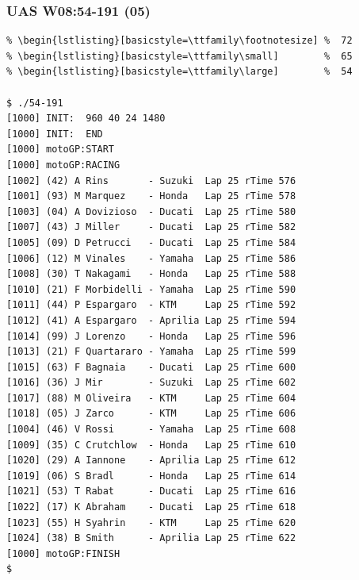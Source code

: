 \documentclass[aspectratio=169, xcolor=table, notheorems, hyperref={pdfpagelabels=false}]{beamer}
\begin{document}
\begin{frame}[fragile]
\frametitle{UAS W08:54-191 (05)}
\begin{lstlisting}[basicstyle=\ttfamily\tiny]         % 108
% \begin{lstlisting}[basicstyle=\ttfamily\tiny]         % 108
% \begin{lstlisting}[basicstyle=\ttfamily\footnotesize] %  72
% \begin{lstlisting}[basicstyle=\ttfamily\small]        %  65
% \begin{lstlisting}[basicstyle=\ttfamily\large]        %  54

$ ./54-191 
[1000] INIT:  960 40 24 1480
[1000] INIT:  END
[1000] motoGP:START
[1000] motoGP:RACING
[1002] (42) A Rins       - Suzuki  Lap 25 rTime 576
[1001] (93) M Marquez    - Honda   Lap 25 rTime 578
[1003] (04) A Dovizioso  - Ducati  Lap 25 rTime 580
[1007] (43) J Miller     - Ducati  Lap 25 rTime 582
[1005] (09) D Petrucci   - Ducati  Lap 25 rTime 584
[1006] (12) M Vinales    - Yamaha  Lap 25 rTime 586
[1008] (30) T Nakagami   - Honda   Lap 25 rTime 588
[1010] (21) F Morbidelli - Yamaha  Lap 25 rTime 590
[1011] (44) P Espargaro  - KTM     Lap 25 rTime 592
[1012] (41) A Espargaro  - Aprilia Lap 25 rTime 594
[1014] (99) J Lorenzo    - Honda   Lap 25 rTime 596
[1013] (21) F Quartararo - Yamaha  Lap 25 rTime 599
[1015] (63) F Bagnaia    - Ducati  Lap 25 rTime 600
[1016] (36) J Mir        - Suzuki  Lap 25 rTime 602
[1017] (88) M Oliveira   - KTM     Lap 25 rTime 604
[1018] (05) J Zarco      - KTM     Lap 25 rTime 606
[1004] (46) V Rossi      - Yamaha  Lap 25 rTime 608
[1009] (35) C Crutchlow  - Honda   Lap 25 rTime 610
[1020] (29) A Iannone    - Aprilia Lap 25 rTime 612
[1019] (06) S Bradl      - Honda   Lap 25 rTime 614
[1021] (53) T Rabat      - Ducati  Lap 25 rTime 616
[1022] (17) K Abraham    - Ducati  Lap 25 rTime 618
[1023] (55) H Syahrin    - KTM     Lap 25 rTime 620
[1024] (38) B Smith      - Aprilia Lap 25 rTime 622
[1000] motoGP:FINISH
$

\end{lstlisting}
\end{frame}

\end{document}
